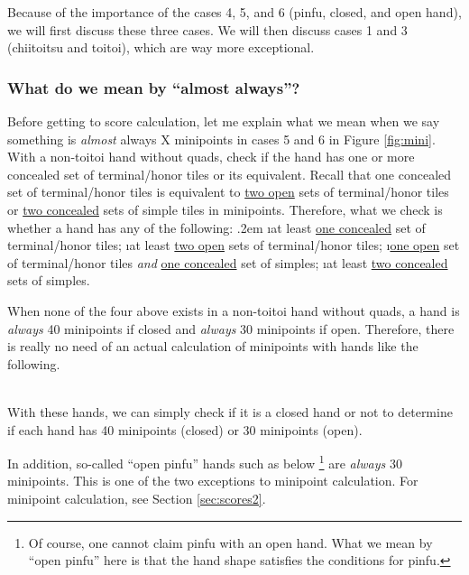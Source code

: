 \bigskip
Because of the importance of the cases 4, 5, and 6 ({\jap pinfu}, closed, and open hand), we will first discuss these three cases. We will then discuss cases 1 and 3 ({\jap chiitoitsu} and {\jap toitoi}), which are way more exceptional. 

\subsubsection{What do we mean by ``almost always''?}
Before getting to score calculation, let me explain what we mean when we say something is \emph{almost} always X minipoints in cases 5 and 6 in Figure \ref{fig:mini}. 
With a non-{\jap toitoi} hand without quads, check if the hand has one or more concealed set of terminal/honor tiles or its equivalent. Recall that one concealed set of terminal/honor tiles is equivalent to \underline{two open} sets of terminal/honor tiles or \underline{two concealed} sets of simple tiles in minipoints. 
Therefore, what we check is whether a hand has any of the following:
\bi \itemsep.2em
\i at least \underline{one concealed} set of terminal/honor tiles;
\i at least \underline{two open} sets of terminal/honor tiles;
\i \underline{one open} set of terminal/honor tiles \emph{and} 
\underline{one concealed} set of simples;
\i at least \underline{two concealed} sets of simples.
\ei

When none of the four above exists in a non-{\jap toitoi} hand without quads, a hand is \emph{always} 40 minipoints if closed and \emph{always} 30 minipoints if open. Therefore, there is really no need of an actual calculation of minipoints with hands like the following. 
\bp
{}~\zhong\rzhong\zhong\\
~\rdong\dong\dong~
\ep

\bigskip
With these hands, we can simply check if it is a closed hand or not to determine if each hand has 40 minipoints (closed) or 30 minipoints (open). 

\bigskip
In addition, so-called ``open {\jap pinfu}'' hands such as below \footnote{Of course, one cannot claim {\jap pinfu} with an open hand. What we mean by ``open {\jap pinfu}'' here is that the hand shape satisfies the conditions for {\jap pinfu}.} are \emph{always} 30 minipoints. This is one of the two exceptions to minipoint calculation. For minipoint calculation, see Section \ref{sec:scores2}.
\bp
{}~\\
\ep


